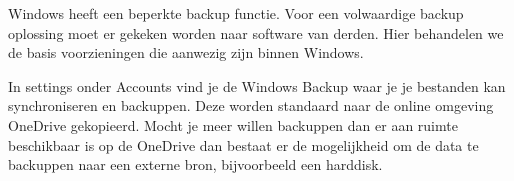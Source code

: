 Windows heeft een beperkte backup functie. Voor een volwaardige backup oplossing moet er gekeken worden naar software van derden. Hier behandelen we de basis voorzieningen die aanwezig zijn binnen Windows.

In settings onder Accounts vind je de Windows Backup waar je je bestanden kan synchroniseren en backuppen. Deze worden standaard naar de online omgeving OneDrive gekopieerd. Mocht je meer willen backuppen dan er aan ruimte beschikbaar is op de OneDrive dan bestaat er de mogelijkheid om de data te backuppen naar een externe bron, bijvoorbeeld een harddisk.

